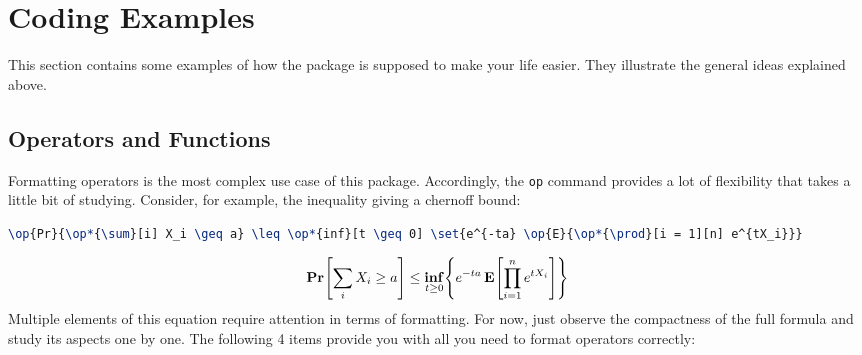 \documentclass[a4paper,10pt]{scrartcl}
\begin{document}
\section{Coding Examples}
This section contains some examples of how the package is supposed to make your life easier. They illustrate the general ideas explained above.

\subsection{Operators and Functions}
Formatting operators is the most complex use case of this package. Accordingly, the \texttt{op} command provides a lot of flexibility that takes a little bit of studying. Consider, for example, the inequality giving a chernoff bound:
\begin{lstlisting}[caption=Chernoff bound, language=TeX]
\op{Pr}{\op*{\sum}[i] X_i \geq a} \leq \op*{inf}[t \geq 0] \set{e^{-ta} \op{E}{\op*{\prod}[i = 1][n] e^{tX_i}}}
\end{lstlisting}
\begin{align} 
  \op{Pr}{\op*{\sum}[i] X_i \geq a} \leq \op*{inf}[t \geq 0] \set{e^{-ta} \op{E}{\op*{\prod}[i = 1][n] e^{tX_i}}}
\end{align}
Multiple elements of this equation require attention in terms of formatting. For now, just observe the compactness of the full formula and study its aspects one by one. The following 4 items provide you with all you need to format operators correctly:
\end{document}
